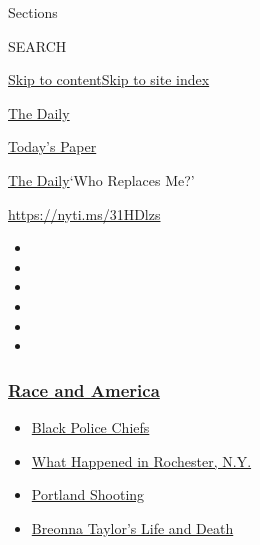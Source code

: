 Sections

SEARCH

\protect\hyperlink{site-content}{Skip to
content}\protect\hyperlink{site-index}{Skip to site index}

\href{https://www.nytimes3xbfgragh.onion/podcasts/the-daily}{The Daily}

\href{https://myaccount.nytimes3xbfgragh.onion/auth/login?response_type=cookie\&client_id=vi}{}

\href{https://www.nytimes3xbfgragh.onion/section/todayspaper}{Today's
Paper}

\href{/podcasts/the-daily}{The Daily}\textbar{}`Who Replaces Me?'

\url{https://nyti.ms/31HDlzs}

\begin{itemize}
\item
\item
\item
\item
\item
\item
\end{itemize}

\hypertarget{race-and-america}{%
\subsubsection{\texorpdfstring{\href{https://www.nytimes3xbfgragh.onion/news-event/george-floyd-protests-minneapolis-new-york-los-angeles?name=styln-george-floyd\&region=TOP_BANNER\&block=storyline_menu_recirc\&action=click\&pgtype=Article\&impression_id=ed815130-f52d-11ea-87a8-05cc251856f7\&variant=undefined}{Race
and America}}{Race and America}}\label{race-and-america}}

\begin{itemize}
\tightlist
\item
  \href{https://www.nytimes3xbfgragh.onion/2020/09/11/us/black-police-chiefs-reform.html?name=styln-george-floyd\&region=TOP_BANNER\&block=storyline_menu_recirc\&action=click\&pgtype=Article\&impression_id=ed815131-f52d-11ea-87a8-05cc251856f7\&variant=undefined}{Black
  Police Chiefs}
\item
  \href{https://www.nytimes3xbfgragh.onion/2020/09/04/nyregion/rochester-police-daniel-prude.html?name=styln-george-floyd\&region=TOP_BANNER\&block=storyline_menu_recirc\&action=click\&pgtype=Article\&impression_id=ed817840-f52d-11ea-87a8-05cc251856f7\&variant=undefined}{What
  Happened in Rochester, N.Y.}
\item
  \href{https://www.nytimes3xbfgragh.onion/2020/08/30/us/portland-shooting-explained.html?name=styln-george-floyd\&region=TOP_BANNER\&block=storyline_menu_recirc\&action=click\&pgtype=Article\&impression_id=ed817841-f52d-11ea-87a8-05cc251856f7\&variant=undefined}{Portland
  Shooting}
\item
  \href{https://www.nytimes3xbfgragh.onion/2020/08/30/us/breonna-taylor-police-killing.html?name=styln-george-floyd\&region=TOP_BANNER\&block=storyline_menu_recirc\&action=click\&pgtype=Article\&impression_id=ed817842-f52d-11ea-87a8-05cc251856f7\&variant=undefined}{Breonna
  Taylor's Life and Death}
\end{itemize}

